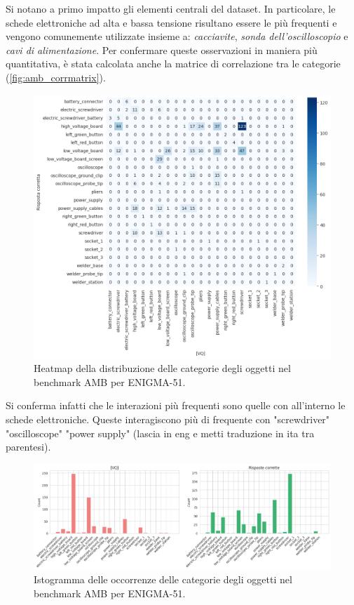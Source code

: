 Si notano a primo impatto gli elementi centrali del dataset. In particolare, le schede elettroniche ad alta e bassa tensione risultano essere le più frequenti e vengono comunemente utilizzate insieme a:
\emph{cacciavite}, \emph{sonda dell'oscilloscopio} e \emph{cavi di alimentazione}.
Per confermare queste osservazioni in maniera più quantitativa, è stata calcolata anche la matrice di correlazione tra le categorie (\autoref{fig:amb_corrmatrix}).

\begin{figure}[ht]
    \centering
    \includegraphics[width=1\linewidth]{Images/enigma_heat.png}
    \caption{Heatmap della distribuzione delle categorie degli oggetti nel benchmark AMB per ENIGMA-51.}
    \label{fig:amb_heatmap}
\end{figure}

Si conferma infatti che le interazioni più frequenti sono quelle con all'interno le schede elettroniche. Queste interagiscono più di frequente con "screwdriver" "oscilloscope" "power supply" (lascia in eng e metti traduzione in ita tra parentesi).

\begin{figure}[ht]
    \centering
    \includegraphics[width=1\linewidth]{Images/enigma_hist.png}
    \caption{Istogramma delle occorrenze delle categorie degli oggetti nel benchmark AMB per ENIGMA-51.}
    \label{fig:amb_corrmatrix}
\end{figure}